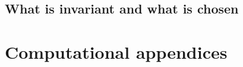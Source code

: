 \documentclass[11pt,openany]{book}
\theoremstyle{definition}
\begin{document}
\chapter{What is invariant and what is chosen}






\appendix
\part{Computational appendices}


\backmatter






\printindex
\end{document}
